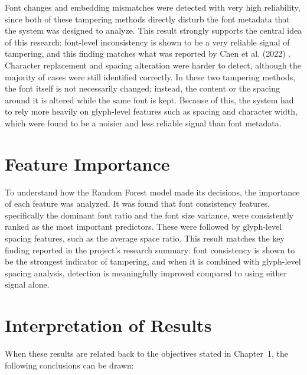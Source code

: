 \noindent Font changes and embedding mismatches were detected with very high reliability, since both of these tampering methods directly disturb the font metadata that the system was designed to analyze. This result strongly supports the central idea of this research: font-level inconsistency is shown to be a very reliable signal of tampering, and this finding matches what was reported by Chen et al. (2022) \cite{Chen2022FontForgery}.\\

\noindent Character replacement and spacing alteration were harder to detect, although the majority of cases were still identified correctly. In these two tampering methods, the font itself is not necessarily changed; instead, the content or the spacing around it is altered while the same font is kept. Because of this, the system had to rely more heavily on glyph-level features such as spacing and character width, which were found to be a noisier and less reliable signal than font metadata.

\section{Feature Importance}

To understand how the Random Forest model made its decisions, the importance of each feature was analyzed. It was found that font consistency features, specifically the dominant font ratio and the font size variance, were consistently ranked as the most important predictors. These were followed by glyph-level spacing features, such as the average space ratio. This result matches the key finding reported in the project's research summary: font consistency is shown to be the strongest indicator of tampering, and when it is combined with glyph-level spacing analysis, detection is meaningfully improved compared to using either signal alone.

\section{Interpretation of Results}

When these results are related back to the objectives stated in Chapter~1, the following conclusions can be drawn:

